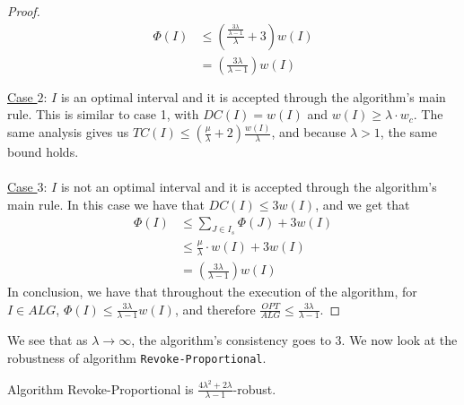 \begin{proof}
\[\begin{aligned}
    \Phi(I) &\leq \left(\frac{\frac{3\lambda}{\lambda - 1}}{\lambda} + 3 \right)w(I) \\
    &= \left(\frac{3\lambda}{\lambda -1}\right)w(I)\\\\
\end{aligned}\]
\underline{Case $2$}: $I$ is an optimal interval and it is accepted through the algorithm's main rule. This is similar to case 1, with $DC(I) = w(I)$ and $w(I)\geq \lambda \cdot w_c$. The same analysis gives us $TC(I)\leq \left( \frac{\mu}{\lambda} + 2 \right)\frac{w(I)}{\lambda}$, and because $\lambda > 1$, the same bound holds.\\\\
\underline{Case $3$}: $I$ is not an optimal interval and it is accepted through the algorithm's main rule. In this case we have that $DC(I) \leq 3w(I)$, and we get that
\[\begin{aligned}
    \Phi(I) & \leq \sum_{J\in I_s} \Phi(J) + 3w(I)\\
    & \leq \frac{\mu}{\lambda}\cdot w(I) + 3w(I)\\
    & = \left(\frac{3\lambda}{\lambda -1}\right)w(I)
\end{aligned}\]
In conclusion, we have that throughout the execution of the algorithm, for $I \in ALG$, $\Phi(I)\leq \frac{3\lambda}{\lambda - 1}w(I)$, and therefore $\frac{OPT}{ALG} \leq \frac{3\lambda}{\lambda - 1}$. 
\end{proof}
\vspace{0.5cm}
We see that as $\lambda \rightarrow \infty$, the algorithm's consistency goes to $3$. We now look at the robustness of algorithm \texttt{Revoke-Proportional}.\\
\begin{theorem}
    Algorithm Revoke-Proportional is $\frac{4\lambda^2 + 2\lambda}{\lambda -1}$-robust.
\end{theorem}
